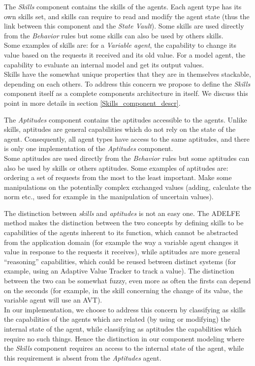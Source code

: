 The \emph{Skills} component contains the skills of the agents. Each agent type has its own skills set, and skills can require to read and modify the agent state (thus the link between this component and the \emph{State Vault}). Some skills are used directly from the \emph{Behavior} rules but some skills can also be used by others skills.\\
Some examples of skills are: for a \emph{Variable agent}, the capability to change its value based on the requests it received and its old value. For a model agent, the capability to evaluate an internal model and get its output values.\\
Skills have the somewhat unique properties that they are in themselves stackable, depending on each others. To address this concern we propose to define the \emph{Skills} component itself as a complete components architecture in itself. We discuss this point in more details in section \ref{Skills_component_descr}.

The \emph{Aptitudes} component contains the aptitudes accessible to the agents. Unlike skills, aptitudes are general capabilities which do not rely on the state of the agent. Consequently, all agent types have access to the same aptitudes, and there is only one implementation of the \emph{Aptitudes} component.\\
Some aptitudes are used directly from the \emph{Behavior} rules but some aptitudes can also be used by skills or others aptitudes.
Some examples of aptitudes are: ordering a set of requests from the most to the least important. Make some manipulations on the potentially complex exchanged values (adding, calculate the norm etc., used for example in the manipulation of uncertain values).

The distinction between \emph{skills} and \emph{aptitudes} is not an easy one. The ADELFE method makes the distinction between the two concepts by defining skills to be capabilities of the agents inherent to its function, which cannot be abstracted from the application domain (for example the way a variable agent 
changes it value in response to the requests it receives), while aptitudes are more general \enquote{reasoning} capabilities, which could be reused between distinct systems (for example, using an Adaptive Value Tracker to track a value). The distinction between the two can be somewhat fuzzy, even more as often the firsts can depend on the seconds (for example, in the skill concerning the change of its value, the variable agent will use an AVT).\\
In our implementation, we choose to address this concern by classifying as skills the capabilities of the agents which are related (by using or modifying) the internal state of the agent, while classifying as aptitudes the capabilities which require no such things. Hence the distinction in our component modeling where the \emph{Skills} component requires an access to the internal state of the agent, while this requirement is absent from the \emph{Aptitudes} agent.

